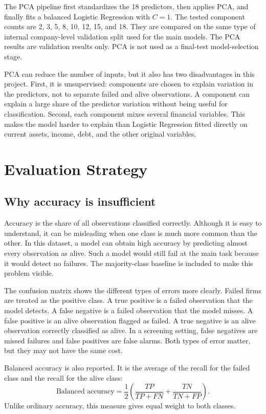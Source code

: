 \documentclass[11pt,a4paper]{article}
\begin{document}
The PCA pipeline first standardizes the 18 predictors, then applies PCA, and
finally fits a balanced Logistic Regression with $C=1$. The tested component
counts are 2, 3, 5, 8, 10, 12, 15, and 18. They are compared on the same type
of internal company-level validation split used for the main models. The PCA
results are validation results only. PCA is not used as a final-test
model-selection stage.

PCA can reduce the number of inputs, but it also has two disadvantages in this
project.
First, it is unsupervised: components are chosen to explain variation in the
predictors, not to separate failed and alive observations. A component can
explain a large share of the predictor variation without being useful for
classification.
Second, each component mixes several financial variables. This makes the model
harder to explain than Logistic Regression fitted directly on current assets,
income, debt, and the other original variables.

\section{Evaluation Strategy}
\label{sec:evaluation}

\subsection{Why accuracy is insufficient}

Accuracy is the share of all observations classified correctly. Although it is
easy to understand, it can be misleading when one class is much more common
than the other. In this dataset, a model can obtain high accuracy by predicting
almost every observation as alive. Such a model would still fail at the main
task because it would detect no failures. The majority-class baseline is
included to make this problem visible.

The confusion matrix shows the different types of errors more clearly. Failed firms are
treated as the positive class. A true positive is a failed observation that the
model detects. A false negative is a failed observation that the model misses.
A false positive is an alive observation flagged as failed. A true negative is
an alive observation correctly classified as alive. In a screening setting,
false negatives are missed failures and false positives are false alarms. Both
types of error matter, but they may not have the same cost.

Balanced accuracy is also reported. It is the average of the recall for the
failed class and the recall for the alive class:
\begin{equation}
  \text{Balanced accuracy}
  = \frac{1}{2}\left(
  \frac{TP}{TP+FN} + \frac{TN}{TN+FP}
  \right).
\end{equation}
Unlike ordinary accuracy, this measure gives equal weight to both classes.
\end{document}
